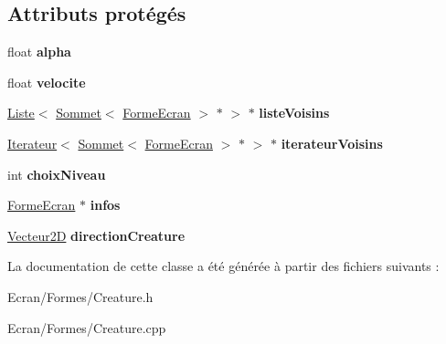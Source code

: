 \subsection*{Attributs protégés}
\begin{DoxyCompactItemize}
\item 
\mbox{\label{class_creature_aca600d3fcbeb29458e6db59ac7818bd6}} 
float {\bfseries alpha}
\item 
\mbox{\label{class_creature_abe23ee5336f9a80a6903e0167f486f41}} 
float {\bfseries velocite}
\item 
\mbox{\label{class_creature_ae1ec097ce2cdc2f1905fab7e124234a6}} 
\mbox{\hyperlink{class_liste}{Liste}}$<$ \mbox{\hyperlink{class_sommet}{Sommet}}$<$ \mbox{\hyperlink{class_forme_ecran}{Forme\+Ecran}} $>$ $\ast$ $>$ $\ast$ {\bfseries liste\+Voisins}
\item 
\mbox{\label{class_creature_aea271fbbce6ae56810f4688f059d161f}} 
\mbox{\hyperlink{class_iterateur}{Iterateur}}$<$ \mbox{\hyperlink{class_sommet}{Sommet}}$<$ \mbox{\hyperlink{class_forme_ecran}{Forme\+Ecran}} $>$ $\ast$ $>$ $\ast$ {\bfseries iterateur\+Voisins}
\item 
\mbox{\label{class_creature_a12c910da4b2a0771167e93e7a330c8b1}} 
int {\bfseries choix\+Niveau}
\item 
\mbox{\label{class_creature_ad21e81563c17a52f90db8caa0c67b6d1}} 
\mbox{\hyperlink{class_forme_ecran}{Forme\+Ecran}} $\ast$ {\bfseries infos}
\item 
\mbox{\label{class_creature_a95ac7239d76b5a5b8eedf13243cb9ec8}} 
\mbox{\hyperlink{class_vecteur2_d}{Vecteur2D}} {\bfseries direction\+Creature}
\end{DoxyCompactItemize}


La documentation de cette classe a été générée à partir des fichiers suivants \+:\begin{DoxyCompactItemize}
\item 
Ecran/\+Formes/Creature.\+h\item 
Ecran/\+Formes/Creature.\+cpp\end{DoxyCompactItemize}
